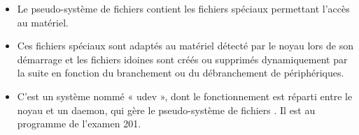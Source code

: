 
\begin{frame}{}

\begin{itemize}

\item Le pseudo-système de fichiers  contient les fichiers spéciaux
permettant l'accès au matériel.

\item Ces fichiers spéciaux sont adaptés au matériel détecté par le noyau lors
de son démarrage et les fichiers idoines sont créés ou supprimés dynamiquement
par la suite en fonction du branchement ou du débranchement de périphériques.

\item C'est un système nommé « udev », dont le fonctionnement est réparti entre
le noyau et un daemon, qui gère le pseudo-système de fichiers . Il
est au programme de l'examen 201.

\end{itemize}

\begin{toile}
\end{toile}

\end{frame}


\newlength{\largeurtableau}
\setlength{\largeurtableau}{\textwidth}
\addtolength{\largeurtableau}{-2\leftmarginii}


